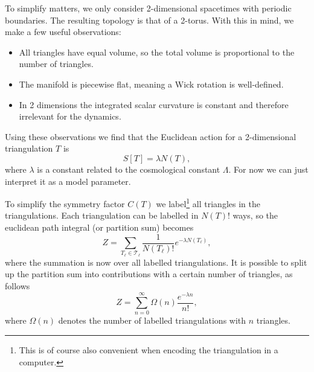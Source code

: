 To simplify matters, we only consider 2-dimensional spacetimes with periodic boundaries. The resulting topology is that of a 2-torus. With this in mind, we make a few useful observations:
\begin{itemize}
    \item All triangles have equal volume, so the total volume is proportional to the number of triangles.
    \item The manifold is piecewise flat, meaning a Wick rotation is well-defined.
    \item In 2 dimensions the integrated scalar curvature is constant and therefore irrelevant for the dynamics.
\end{itemize}
Using these observations we find that the Euclidean action for a 2-dimensional triangulation $T$ is \cite{2012}
\begin{equation}
    S[T] = \lambda N(T),
\end{equation}
where $\lambda$ is a constant related to the cosmological constant $\Lambda$. For now we can just interpret it as a model parameter.

To simplify the symmetry factor $C(T)$ we label\footnote{This is of course also convenient when encoding the triangulation in a computer.} all triangles in the triangulations. Each triangulation can be labelled in $N(T)!$ ways, so the euclidean path integral (or partition sum) becomes
\begin{equation}
    Z
    =
    \sum_{T_\ell \in \mathcal{T}_\ell} \frac{1}{N(T_\ell)!} e^{- \lambda N(T_\ell)}
    ,
\end{equation}
where the summation is now over all labelled triangulations. It is possible to split up the partition sum into contributions with a certain number of triangles, as follows
\begin{equation}\label{eq:part_sum}
    Z
    =
    \sum_{n = 0}^\infty \Omega(n) \frac{e^{- \lambda n}}{n!}
    ,
\end{equation}
where $\Omega(n)$ denotes the number of labelled triangulations with $n$ triangles.

